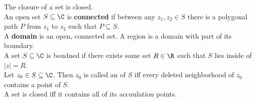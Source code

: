 \documentclass{article}
\begin{document}
 The closure of a set is closed.\\

 An open set $S\subseteq \C$ is \textbf{connected} if between any $z_1,z_2\in S$ there is a polygonal path $P$ from $z_1$ to $z_2$ such that $P\subseteq S$.\\


 A \textbf{domain} is an open, connected set. A region is a domain with part of its boundary. \\
 A set $S\subseteq \C$ is boudned if there exists some set $R\in \R$ such that $S$ lies inside of $|z| = R$.\\

 Let $z_0\in S\subseteq \C$. Then $z_0$ is called an  of $S$ iff every deleted neighborhood of $z_0$ contains a point of $S$.\\

 A set is closed iff it contains all of its accuulation points.
\end{document}
